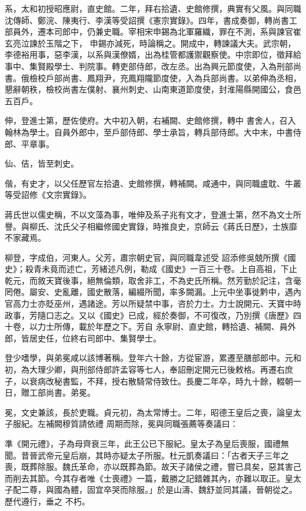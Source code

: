 \begin{pinyinscope}
 系，太和初授昭應尉，直史館。二年，拜右拾遺、史館修撰，典實有父風。與同職沈傳師、鄭浣、陳夷行、李漢等受詔撰《憲宗實錄》。四年，書成奏御，轉尚書工部員外，遷本司郎中，仍兼史職。宰相宋申錫為北軍羅織，罪在不測，系與諫官崔玄亮泣諫於玉階之下，
 申錫亦減死，時論稱之。開成中，轉諫議大夫。武宗朝，李德裕用事，惡李漢，以系與漢僚婿，出為桂管都護禦觀察使。中宗即位，徵拜給事中、集賢殿學士、判院事。轉吏部侍郎，改左丞。出為興元節度使，入為刑部尚書。俄檢校戶部尚書、鳳翔尹，充鳳翔隴節度使，入為兵部尚書。以弟伸為丞相，懇辭朝秩，檢校尚書左僕射、襄州刺史、山南東道節度使，封淮陽縣開國公，食邑五百戶。



 伸，登進士第，歷佐使府。大中初入朝，右補闕、史館修撰，轉中
 書舍人，召入翰林為學士。自員外郎中，至戶部侍郎、學士承旨，轉兵部侍郎。大中末，中書侍郎、平章事。



 仙、佶，皆至刺史。



 偕，有史才，以父任歷官左拾遺、史館修撰，轉補闕。咸通中，與同職盧耽、牛叢等受詔修《文宗實錄》。



 蔣氏世以儒史稱，不以文藻為事，唯伸及系子兆有文才，登進士第，然不為文士所譽。與柳氏、沈氏父子相繼修國史實錄，時推良史，京師云《蔣氏日歷》，士族靡不家藏焉。



 柳登，字成伯，河東人。父芳，肅宗朝史官，與同職韋述受
 詔添修吳兢所撰《國史》；殺青未竟而述亡，芳緒述凡例，勒成《國史》一百三十卷。上自高祖，下止乾元，而敘天寶後事，絕無倫類，取舍非工，不為史氏所稱。然芳勤於記注，含毫罔倦。屬安、史亂離，國史散落，編綴所聞，率多闕漏。上元中坐事徙黔中，遇內官高力士亦貶巫州，遇諸途。芳以所疑禁中事，咨於力士。力士說開元、天寶中時政事，芳隨口志之。又以《國史》已成，經於奏御，不可復改，乃別撰《唐歷》四十卷，以力士所傳，載於年歷之下。芳自
 永寧尉、直史館，轉拾遺、補闕、員外郎，皆居史任，位終右司郎中、集賢學士。



 登少嗜學，與弟冕咸以該博著稱。登年六十餘，方從宦游，累遷至膳部郎中。元和初，為大理少卿，與刑部侍郎許孟容等七人，奉詔刪定開元已後敕格。再遷右庶子，以衰病改秘書監，不拜，授右散騎常侍致仕。長慶二年卒，時九十餘，輟朝一日，贈工部尚書。弟冕。



 冕，文史兼該，長於吏職。貞元初，為太常博士。二年，昭德王皇后之喪，論皇太子服紀。左補闕穆質請依禮
 周期而除，冕與同職張薦等奏議曰：



 準《開元禮》，子為母齊衰三年，此王公已下服紀。皇太子為皇后喪服，國禮無聞。昔晉武帝元皇后崩，其時亦疑太子所服。杜元凱奏議曰：「古者天子三年之喪，既葬除服。魏氏革命，亦以既葬為節。故天子諸侯之禮，嘗已具矣，惡其害己而削去其節。今其存者唯《士喪禮》一篇，戴勝之記錯雜其內，亦難以取正。皇太子配二尊，與國為體，固宜卒哭而除服。」於是山濤、魏舒並同其議，晉朝從之。歷代遵行，垂之
 不朽。




\end{pinyinscope}
